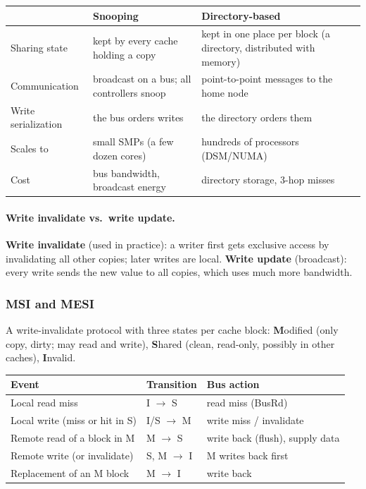 \begin{center}
\small
\begin{tabular}{@{}lP{6cm}P{6cm}@{}}
\toprule
& Snooping & Directory-based \\
\midrule
Sharing state & kept by every cache holding a copy & kept in one place per block (a directory, distributed with memory) \\
Communication & broadcast on a bus; all controllers snoop & point-to-point messages to the home node \\
Write serialization & the bus orders writes & the directory orders them \\
Scales to & small SMPs (a few dozen cores) & hundreds of processors (DSM/NUMA) \\
Cost & bus bandwidth, broadcast energy & directory storage, 3-hop misses \\
\bottomrule
\end{tabular}
\end{center}

\paragraph{Write invalidate vs.\ write update.} \textbf{Write invalidate} (used in
practice): a writer first gets exclusive access by invalidating all other copies;
later writes are local. \textbf{Write update} (broadcast): every write sends the new
value to all copies, which uses much more bandwidth.

\subsubsection{MSI and MESI}
\begin{definition}
A write-invalidate protocol with three states per cache block:
\textbf{M}odified (only copy, dirty; may read and write), \textbf{S}hared (clean,
read-only, possibly in other caches), \textbf{I}nvalid.
\end{definition}
\begin{center}
\small
\begin{tabular}{@{}lll@{}}
\toprule
Event & Transition & Bus action \\
\midrule
Local read miss & I $\to$ S & read miss (BusRd) \\
Local write (miss or hit in S) & I/S $\to$ M & write miss / invalidate \\
Remote read of a block in M & M $\to$ S & write back (flush), supply data \\
Remote write (or invalidate) & S, M $\to$ I & M writes back first \\
Replacement of an M block & M $\to$ I & write back \\
\bottomrule
\end{tabular}
\end{center}

